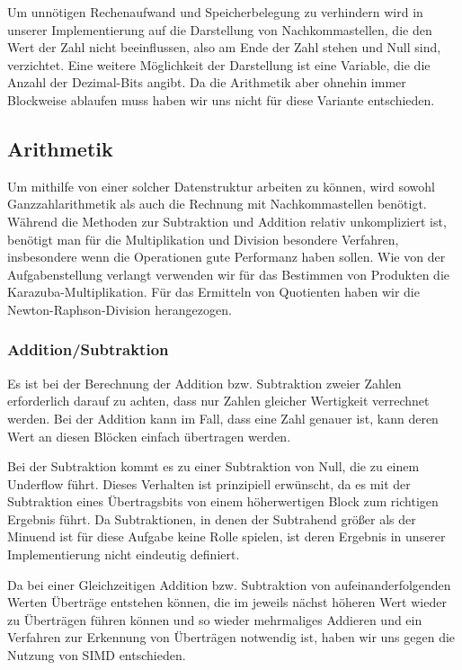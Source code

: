\documentclass[course=erap]{aspdoc}
\begin{document}
	
	Um unnötigen Rechenaufwand und Speicherbelegung zu verhindern wird in unserer Implementierung auf die Darstellung von Nachkommastellen, die den Wert der Zahl nicht beeinflussen, also am Ende der Zahl stehen und Null sind, verzichtet.
	Eine weitere Möglichkeit der Darstellung ist eine Variable, die die Anzahl der Dezimal-Bits angibt. Da die Arithmetik aber ohnehin immer Blockweise ablaufen muss haben wir uns nicht für diese Variante entschieden.
	
	\subsection{Arithmetik}
	Um mithilfe von einer solcher Datenstruktur arbeiten zu können, wird sowohl Ganzzahlarithmetik als auch die Rechnung mit Nachkommastellen benötigt. Während die Methoden zur Subtraktion und Addition relativ unkompliziert ist, benötigt man für die Multiplikation und Division besondere Verfahren, insbesondere wenn die Operationen gute Performanz haben sollen.
	Wie von der Aufgabenstellung verlangt verwenden wir für das Bestimmen von Produkten die Karazuba-Multiplikation. Für das Ermitteln von Quotienten haben wir die Newton-Raphson-Division herangezogen.
	
	\subsubsection{Addition/Subtraktion}
	Es ist bei der Berechnung der Addition bzw. Subtraktion zweier Zahlen erforderlich darauf zu achten, dass nur Zahlen gleicher Wertigkeit verrechnet werden. Bei der Addition kann im Fall, dass eine Zahl genauer ist, kann deren Wert an diesen Blöcken einfach übertragen werden.
	
	Bei der Subtraktion kommt es zu einer Subtraktion von Null, die zu einem Underflow führt. Dieses Verhalten ist prinzipiell erwünscht, da es mit der Subtraktion eines Übertragsbits von einem höherwertigen Block zum richtigen Ergebnis führt.
	Da Subtraktionen, in denen der Subtrahend größer als der Minuend ist für diese Aufgabe keine Rolle spielen, ist deren Ergebnis in unserer Implementierung nicht eindeutig definiert.
	
	Da bei einer Gleichzeitigen Addition bzw. Subtraktion von aufeinanderfolgenden Werten Überträge entstehen können, die im jeweils nächst höheren Wert wieder zu Überträgen führen können und so wieder mehrmaliges Addieren und ein Verfahren zur Erkennung von Überträgen notwendig ist, haben wir uns gegen die Nutzung von SIMD entschieden.
	
\end{document}
